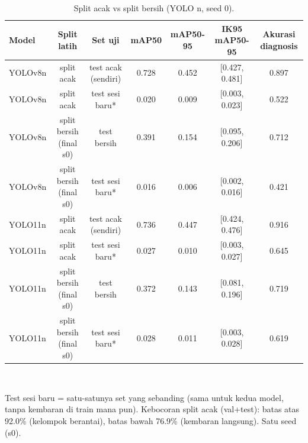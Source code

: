 \begin{table}[!t]
\centering
\caption{Split acak vs split bersih (YOLO n, seed 0).}
\label{tab:split_acak}
\footnotesize
\begin{tabular}{lcccccc}
\hline
\textbf{Model} & \textbf{Split latih} & \textbf{Set uji} & \textbf{mAP50} & \textbf{mAP50-95} & \textbf{IK95 mAP50-95} & \textbf{Akurasi diagnosis} \\
\hline
YOLOv8n & split acak & test acak (sendiri) & 0.728 & 0.452 & [0.427, 0.481] & 0.897 \\
YOLOv8n & split acak & test sesi baru* & 0.020 & 0.009 & [0.003, 0.023] & 0.522 \\
YOLOv8n & split bersih (final s0) & test bersih & 0.391 & 0.154 & [0.095, 0.206] & 0.712 \\
YOLOv8n & split bersih (final s0) & test sesi baru* & 0.016 & 0.006 & [0.002, 0.016] & 0.421 \\
YOLO11n & split acak & test acak (sendiri) & 0.736 & 0.447 & [0.424, 0.476] & 0.916 \\
YOLO11n & split acak & test sesi baru* & 0.027 & 0.010 & [0.003, 0.027] & 0.645 \\
YOLO11n & split bersih (final s0) & test bersih & 0.372 & 0.143 & [0.081, 0.196] & 0.719 \\
YOLO11n & split bersih (final s0) & test sesi baru* & 0.028 & 0.011 & [0.003, 0.028] & 0.619 \\
\hline
\end{tabular}
\\[2pt]\parbox{\columnwidth}{\scriptsize *Test sesi baru = satu-satunya set yang sebanding (sama untuk kedua model, tanpa kembaran di train mana pun). Kebocoran split acak (val+test): batas atas 92.0\% (kelompok berantai), batas bawah 76.9\% (kembaran langsung). Satu seed (s0).}
\end{table}
